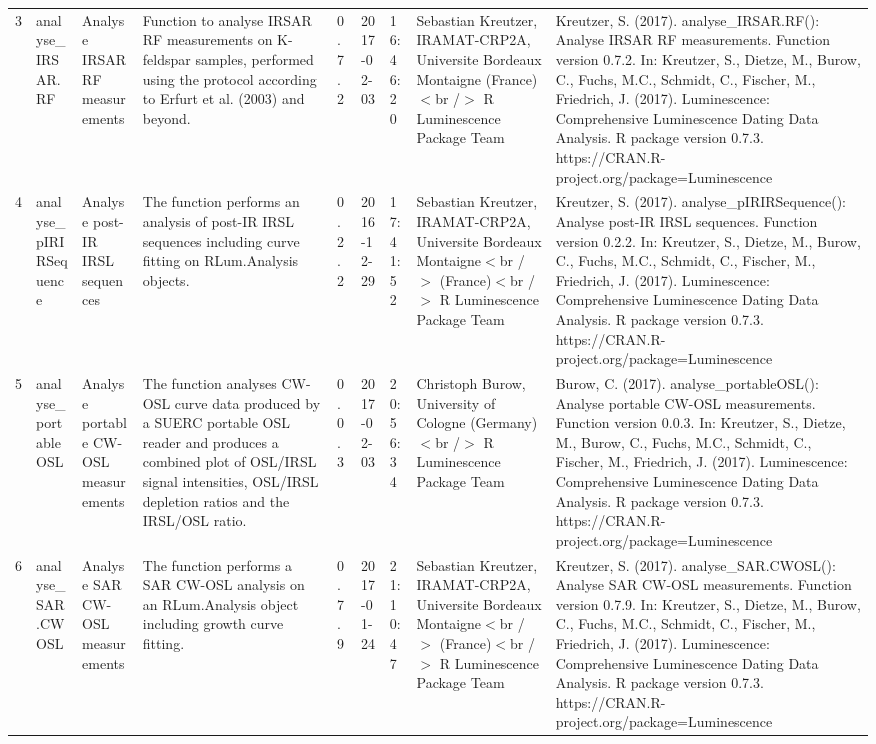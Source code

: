 \begin{table}[ht]
\begin{tabular}{rllllllll}
 \\ 
  3 & analyse\_IRSAR.RF & Analyse IRSAR RF measurements & Function to analyse IRSAR RF measurements on K-feldspar samples, performed using the protocol according to Erfurt et al. (2003) and beyond. & 0.7.2 & 2017-02-03 & 16:46:20
 & Sebastian Kreutzer, IRAMAT-CRP2A, Universite Bordeaux Montaigne (France)$<$br /$>$  R Luminescence Package Team & Kreutzer, S. (2017). analyse\_IRSAR.RF(): Analyse IRSAR RF measurements. Function version 0.7.2. In: Kreutzer, S., Dietze, M., Burow, C., Fuchs, M.C., Schmidt, C., Fischer, M., Friedrich, J. (2017). Luminescence: Comprehensive Luminescence Dating Data Analysis. R package version 0.7.3. https://CRAN.R-project.org/package=Luminescence
 \\ 
  4 & analyse\_pIRIRSequence & Analyse post-IR IRSL sequences & The function performs an analysis of post-IR IRSL sequences including curve fitting on  RLum.Analysis  objects. & 0.2.2 & 2016-12-29 & 17:41:52
 & Sebastian Kreutzer, IRAMAT-CRP2A, Universite Bordeaux Montaigne$<$br /$>$ (France)$<$br /$>$  R Luminescence Package Team & Kreutzer, S. (2017). analyse\_pIRIRSequence(): Analyse post-IR IRSL sequences. Function version 0.2.2. In: Kreutzer, S., Dietze, M., Burow, C., Fuchs, M.C., Schmidt, C., Fischer, M., Friedrich, J. (2017). Luminescence: Comprehensive Luminescence Dating Data Analysis. R package version 0.7.3. https://CRAN.R-project.org/package=Luminescence
 \\ 
  5 & analyse\_portableOSL & Analyse portable CW-OSL measurements & The function analyses CW-OSL curve data produced by a SUERC portable OSL reader and produces a combined plot of OSL/IRSL signal intensities, OSL/IRSL depletion ratios and the IRSL/OSL ratio. & 0.0.3 & 2017-02-03 & 20:56:34
 & Christoph Burow, University of Cologne (Germany)$<$br /$>$  R Luminescence Package Team & Burow, C. (2017). analyse\_portableOSL(): Analyse portable CW-OSL measurements. Function version 0.0.3. In: Kreutzer, S., Dietze, M., Burow, C., Fuchs, M.C., Schmidt, C., Fischer, M., Friedrich, J. (2017). Luminescence: Comprehensive Luminescence Dating Data Analysis. R package version 0.7.3. https://CRAN.R-project.org/package=Luminescence
 \\ 
  6 & analyse\_SAR.CWOSL & Analyse SAR CW-OSL measurements & The function performs a SAR CW-OSL analysis on an RLum.Analysis  object including growth curve fitting. & 0.7.9 & 2017-01-24 & 21:10:47
 & Sebastian Kreutzer, IRAMAT-CRP2A, Universite Bordeaux Montaigne$<$br /$>$ (France)$<$br /$>$  R Luminescence Package Team & Kreutzer, S. (2017). analyse\_SAR.CWOSL(): Analyse SAR CW-OSL measurements. Function version 0.7.9. In: Kreutzer, S., Dietze, M., Burow, C., Fuchs, M.C., Schmidt, C., Fischer, M., Friedrich, J. (2017). Luminescence: Comprehensive Luminescence Dating Data Analysis. R package version 0.7.3. https://CRAN.R-project.org/package=Luminescence

\end{tabular}
\end{table}
